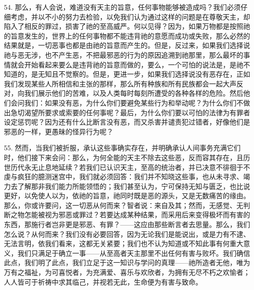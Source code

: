 54. 那么，有人会说，难道没有天主的旨意，任何事物能够被造成吗？我们必须仔细考虑，并以不小的努力去检验，以免我们认为通过这样的问题是在尊敬天主，却陷入了相反的罪过，损害了祂的至高威严。何以见得？因为，如果万物都是按照祂的旨意发生的，世界上的任何事物都不能违背祂的意愿而成功或失败，那么必然的结果就是，一切恶事也都是由祂的旨意而产生的。但是，反过来，如果我们选择说祂与恶无涉，也不产生恶，不把最邪恶的行为的原因追溯到祂那里，那么最坏的事情就会开始看起来要么是违背祂的旨意而做的，要么，一个可怕的说法是，是祂不知道的，是无知且不觉察的。但是，更进一步，如果我们选择说没有恶存在，正如我们发现某些人所相信和主张的那样，那么所有种族和所有民族都会一起大声反对，向我们展示他们的苦难，以及人类每时每刻所遭受的各种各样的危险。然后他们会问我们：如果没有恶，为什么你们要避免某些行为和举动呢？为什么你们不做出急切渴望所要求或索要的任何事呢？最后，为什么你们要以可怕的法律为有罪者设定惩罚呢？因为还有什么比断言没有恶，而又杀害并谴责犯过错者，好像他们是邪恶的一样，更愚昧的怪异行为呢？\par

55. 然而，当我们被折服，承认这些事确实存在，并明确承认人间事务充满它们时，他们接下来会问：那么，为何全能的天主不除去这些恶，反而容其存在，且历世历代永无止息地延续？若我们已认识天主，至高的统治者，并已决意不徘徊于不虔与疯狂的臆测迷宫中，我们就必须回答：我们并不知晓这些事，也从未寻求、竭力去了解那非我们能力所能领悟的；我们甚至认为，宁可保持无知与匮乏，也比说更好，以免使人以为，依祂的旨意，祂同时既是恶的源头，又是无数痛苦的缘由。那么，你或许要问，这一切恶从何而来？智者说：来自及其；然而，无感觉、无判断之物怎能被视为邪恶或罪过？若要达成某种结果，而采用后来变得极坏而有害的东西，那施行者岂非更是邪恶、有罪？——这应由那些断言者去思量。那么，我们怎么说？从何而来？我们没有必要回答，因为无论我们是能说出，或是力有不逮、无法言明，依我们看来，这都无关紧要；我们也不认为知道或不知此事有何重大意义，我们只满足于确立一事——从至高者天主那里不出任何有害与败坏。我们确信此点，我们明了此点，我们立足于这一知识与学问的真理——祂所造者无他，唯为万有之福祉，为可喜悦者，为充满爱、喜乐与欢欣者，为拥有无尽不朽之欢愉者；人人皆可于祈祷中求其临己，并视若无此，生命便为有害与致命。\par

